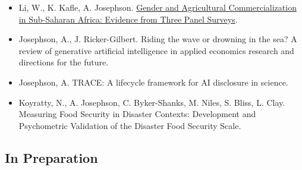 \documentclass[letterpaper]{article}
\begin{document}
\begin{itemize}

\item Li, W., K. Kafle, A. Josephson. \href{https://arxiv.org/abs/2509.19556}{Gender and Agricultural Commercialization in Sub-Saharan Africa: Evidence from Three Panel Surveys}. 

\item Josephson, A., J. Ricker-Gilbert. Riding the wave or drowning in the sea? A review of generative artificial intelligence in applied economics research and directions for the future. 

\item Josephson, A. TRACE: A lifecycle framework for AI disclosure in science.

\item Koyratty, N., A. Josephson, C. Byker-Shanks, M. Niles, S. Bliss, L. Clay. Measuring Food Security in Disaster Contexts: Development and Psychometric Validation of the Disaster Food Security Scale.

\end{itemize}

\subsection*{In Preparation}
\end{document}
